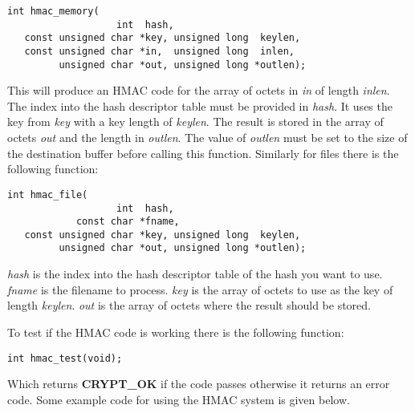 \documentclass[synpaper]{book}
\begin{document}
\begin{verbatim}
int hmac_memory(
                   int  hash, 
   const unsigned char *key, unsigned long  keylen,
   const unsigned char *in,  unsigned long  inlen, 
         unsigned char *out, unsigned long *outlen);
\end{verbatim}
This will produce an HMAC code for the array of octets in \textit{in} of length \textit{inlen}.  The index into the hash descriptor 
table must be provided in \textit{hash}.  It uses the key from \textit{key} with a key length of \textit{keylen}.  
The result is stored in the array of octets \textit{out} and the length in \textit{outlen}.  The value of \textit{outlen} must be set
to the size of the destination buffer before calling this function.  Similarly for files there is the  following function:
\begin{verbatim}
int hmac_file(
                   int  hash, 
            const char *fname, 
   const unsigned char *key, unsigned long  keylen, 
         unsigned char *out, unsigned long *outlen);
\end{verbatim}
\textit{hash} is the index into the hash descriptor table of the hash you want to use.  \textit{fname} is the filename to process.  
\textit{key} is the array of octets to use as the key of length \textit{keylen}.  \textit{out} is the array of octets where the 
result should be stored.

To test if the HMAC code is working there is the following function:
\begin{verbatim}
int hmac_test(void);
\end{verbatim}
Which returns {\bf CRYPT\_OK} if the code passes otherwise it returns an error code.  Some example code for using the 
HMAC system is given below.
\end{document}

